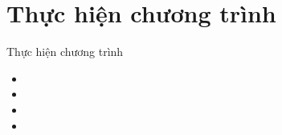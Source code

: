 \documentclass{beamer}
\numberwithin{equation}{section}
\begin{document}
\section{Thực hiện chương trình}
\begin{frame}{Thực hiện chương trình}
\begin{itemize}
\item
\item
\item
\item
\end{itemize}
\end{frame}
%

\end{document}
